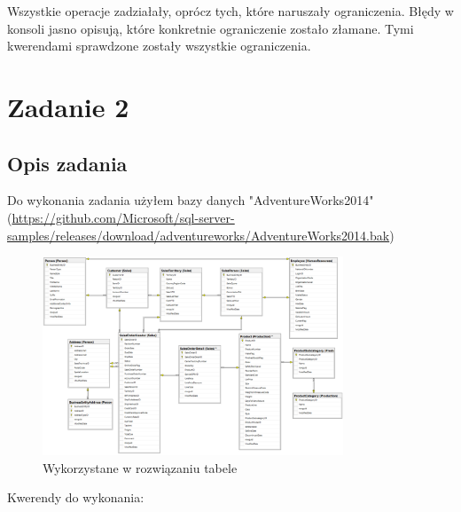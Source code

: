 \documentclass[a4paper,12pt]{article}
\begin{document}
Wszystkie operacje zadziałały, oprócz tych, które naruszały ograniczenia. Błędy w konsoli jasno opisują, które konkretnie ograniczenie zostało złamane. Tymi kwerendami sprawdzone zostały wszystkie ograniczenia.

\section{Zadanie 2}

\subsection{Opis zadania}

Do wykonania zadania użyłem bazy danych "AdventureWorks2014" (\url{https://github.com/Microsoft/sql-server-samples/releases/download/adventureworks/AdventureWorks2014.bak})

\begin{figure}[H]
    \centering
    \includegraphics[width=0.8\textwidth]{images/useful_tables.png}
    \caption{Wykorzystane w rozwiązaniu tabele}
    \end{figure}

Kwerendy do wykonania:
\end{document}

